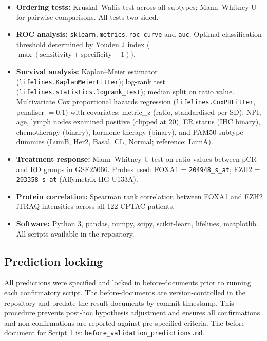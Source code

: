 \documentclass[12pt, a4paper]{article}
\begin{document}
\begin{itemize}
  \item \textbf{Ordering tests:} Kruskal--Wallis test
        across all subtypes; Mann--Whitney U for pairwise
        comparisons. All tests two-sided.
  \item \textbf{ROC analysis:} \texttt{sklearn.metrics.roc\_curve}
        and \texttt{auc}. Optimal classification threshold
        determined by Youden J index
        ($\max(\text{sensitivity} + \text{specificity} - 1)$).
  \item \textbf{Survival analysis:} Kaplan--Meier estimator
        (\texttt{lifelines.KaplanMeierFitter}); log-rank
        test (\texttt{lifelines.statistics.logrank\_test});
        median split on ratio value. Multivariate Cox
        proportional hazards regression
        (\texttt{lifelines.CoxPHFitter}, penaliser $= 0.1$)
        with covariates: metric\_z (ratio, standardised
        per-SD), NPI, age, lymph nodes examined positive
        (clipped at 20), ER status (IHC binary), chemotherapy
        (binary), hormone therapy (binary), and PAM50 subtype
        dummies (LumB, Her2, Basal, CL, Normal; reference:
        LumA).
  \item \textbf{Treatment response:} Mann--Whitney U test
        on ratio values between pCR and RD groups in
        GSE25066. Probes used: FOXA1 = \texttt{204948\_s\_at};
        EZH2 = \texttt{203358\_s\_at} (Affymetrix HG-U133A).
  \item \textbf{Protein correlation:} Spearman rank
        correlation between FOXA1 and EZH2 iTRAQ intensities
        across all 122 CPTAC patients.
  \item \textbf{Software:} Python 3, pandas, numpy, scipy,
        scikit-learn, lifelines, matplotlib. All scripts
        available in the repository.
\end{itemize}

\subsection{Prediction locking}

All predictions were specified and locked in
before-documents prior to running each confirmatory
script. The before-documents are version-controlled in
the repository and predate the result documents by
commit timestamp. This procedure prevents post-hoc
hypothesis adjustment and ensures all confirmations
and non-confirmations are reported against pre-specified
criteria. The before-document for Script 1 is:
\href{https://github.com/Eric-Robert-Lawson/attractor-oncology/blob/main/Cancer_Research/BRCA/DEEP_DIVE/MAJOR_FINDINGS/FOXA1_EZH2_RATIO/before_validation_predictions.md}
{\texttt{before\_validation\_predictions.md}}.
\end{document}
